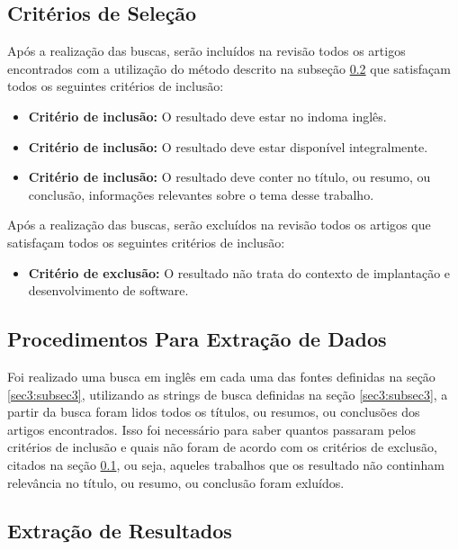 \documentclass[12pt]{article}
\begin{document}
\subsection{Critérios de Seleção} \label{sec3:subsec4}

Após a realização das buscas, serão incluídos na revisão todos os artigos encontrados com a utilização do método descrito na subseção \ref{sec3:subsec5} que satisfaçam todos os seguintes critérios de inclusão:

 \begin{itemize}
   \item  \textbf{Critério de inclusão:} O resultado deve estar no indoma inglês.
   \item  \textbf{Critério de inclusão:}  O resultado deve estar disponível integralmente.
   \item  \textbf{Critério de inclusão:}   O resultado deve conter no título, ou resumo, ou conclusão,  informações relevantes sobre o tema desse trabalho.
 \end{itemize}

 Após a realização das buscas, serão excluídos na revisão todos os artigos que satisfaçam todos os seguintes critérios de inclusão:

 \begin{itemize}
   \item  \textbf{Critério de exclusão:} O resultado não trata do contexto de implantação e desenvolvimento de software.
 \end{itemize}

\subsection{Procedimentos Para Extração de Dados} \label{sec3:subsec5}

Foi realizado uma busca em inglês em cada uma das fontes definidas na seção \ref{sec3:subsec3}, utilizando as strings de busca definidas na seção \ref{sec3:subsec3}, a partir da busca foram lidos todos os títulos, ou resumos, ou conclusões dos artigos encontrados. Isso foi necessário para saber quantos passaram pelos critérios de inclusão e quais não foram de acordo com os critérios de exclusão, citados na seção \ref{sec3:subsec4}, ou seja, aqueles trabalhos que os resultado não continham relevância no título, ou resumo, ou conclusão foram exluídos.

\subsection{Extração de Resultados} \label{sec3:subsec6}
\end{document}
